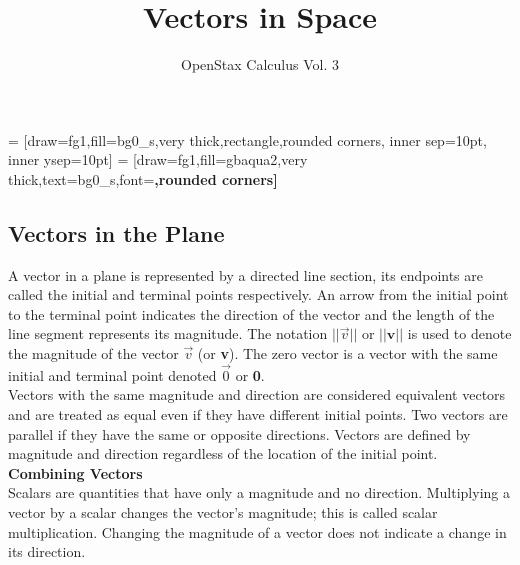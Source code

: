 \documentclass[a4paper]{article}
\title{Vectors in Space}
\author{OpenStax Calculus Vol. 3}
\date{}
\let\bf\textbf
\begin{document}
\pagestyle{plain}

\color{fg1}
\pagecolor{bg0_s}

 = [draw=fg1,fill=bg0_s,very thick,rectangle,rounded corners, inner sep=10pt, inner ysep=10pt]
 = [draw=fg1,fill=gbaqua2,very thick,text=bg0_s,font=\bfseries,rounded corners]

\setcounter{section}{2}
\maketitle

\subsection{Vectors in the Plane}
A vector in a plane is represented by a directed line section, its endpoints are called the initial and terminal points respectively. An arrow from the initial point to the terminal point indicates the direction of the vector and the length of the line segment represents its magnitude. The notation $||\vec{v}||$ or $||\bf{v}||$ is used to denote the magnitude of the vector $\vec{v}$ (or \bf{v}). The zero vector is a vector with the same initial and terminal point denoted $\vec{0}$ or \bf{0}. 
\vspace{1mm}\\
Vectors with the same magnitude and direction are considered equivalent vectors and are treated as equal even if they have different initial points. Two vectors are parallel if they have the same or opposite directions. Vectors are defined by magnitude and direction regardless of the location of the initial point.
\vspace{2mm}\\
\bf{Combining Vectors}\vspace{2mm}\\
Scalars are quantities that have only a magnitude and no direction. Multiplying a vector by a scalar changes the vector's magnitude; this is called scalar multiplication. Changing the magnitude of a vector does not indicate a change in its direction.
\end{document}
